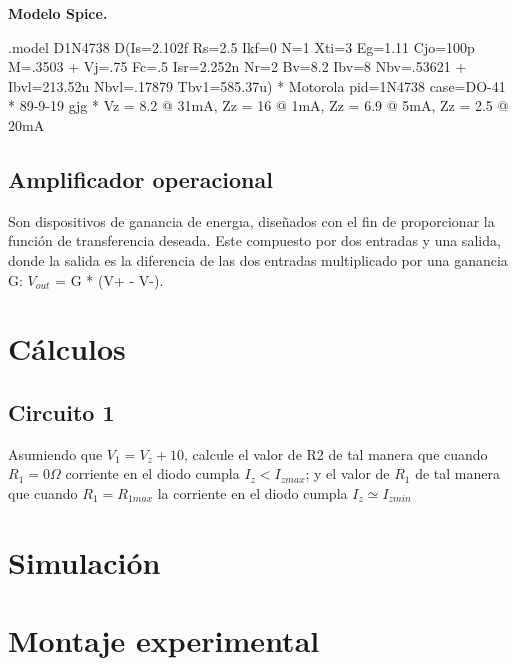 \documentclass[journal]{IEEEtran}
\begin{document}
\textbf{Modelo Spice.}

.model D1N4738 D(Is=2.102f Rs=2.5 Ikf=0 N=1 Xti=3
Eg=1.11 Cjo=100p M=.3503 + Vj=.75 Fc=.5 Isr=2.252n
Nr=2 Bv=8.2 Ibv=8 Nbv=.53621 + Ibvl=213.52u
Nbvl=.17879 Tbv1=585.37u) * Motorola pid=1N4738
case=DO-41 * 89-9-19 gjg * Vz = 8.2 @ 31mA, Zz = 16
@ 1mA, Zz = 6.9 @ 5mA, Zz = 2.5 @ 20mA

\subsection{Amplificador operacional}
Son dispositivos de ganancia de energıa, diseñados con
el fin de proporcionar la función de transferencia deseada.
Este compuesto por dos entradas y una salida, donde la
salida es la diferencia de las dos entradas multiplicado por
una ganancia G: $V_{out}$ = G * (V+ - V-).


\section{Cálculos}

\subsection{Circuito 1}
Asumiendo que $V_1 = V_z + 10$, calcule el valor de R2
de tal manera que cuando $R_{1} = 0 \Omega$ corriente en el diodo
cumpla $I_z < I_{zmax}$; y el valor de $R_1$ de tal manera que
cuando $R_1 = R_{1max}$ la corriente en el diodo cumpla
$I_z \simeq I_{zmin}$




\section{Simulación}

\section{Montaje experimental}
\end{document}
